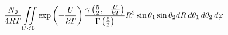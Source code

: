 \documentclass[12pt]{article}
\newcommand{\lb}{\left(}
\newcommand{\rb}{\right)}
\newcommand{\iintl}{\iint\limits}
\begin{document}
\begin{gather}
		\frac{N_0}{4 R T} \iintl_{U < 0} \exp \lb - \frac{U}{kT} \rb \frac{ \gamma \lb \frac{5}{2}, - \frac{U}{kT} \rb}{\Gamma \lb \frac{5}{2} \rb } R^2 \sin \theta_1 \sin \theta_2 d R \, d \theta_1 \, d \theta_2 \, d \varphi\notag 
\end{gather}
\end{document}
